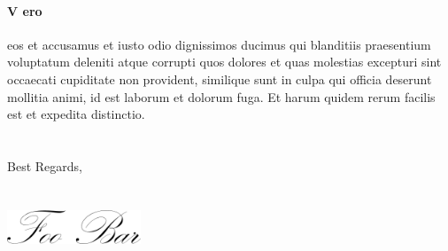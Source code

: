 \documentclass[roboto,noadress,custcol]{friggeri-txt}                       %
\begin{document}
\begin{letter}
\paragraph{V ero }{eos et accusamus et iusto odio dignissimos ducimus qui blanditiis praesentium voluptatum deleniti atque corrupti quos dolores et quas molestias excepturi sint occaecati cupiditate non provident, similique sunt in culpa qui officia deserunt mollitia animi, id est laborum et dolorum fuga. Et harum quidem rerum facilis est et expedita distinctio. }
\\
\\
\\
Best Regards,\\
\\
\\
\includegraphics[width=40mm]{signature.png}                                                %
\vspace*{-40pt}
\end{letter}
\end{document}
